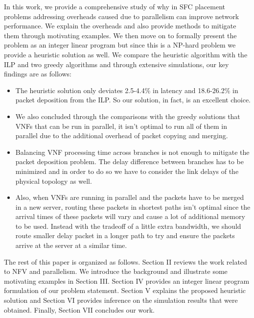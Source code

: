 \documentclass[journal]{IEEEtran}
\begin{document}
In this work, we provide a comprehensive study of why in SFC placement problems addressing overheads caused due to parallelism can improve network performance. We explain the overheads and also provide methods to mitigate them through motivating examples. We then move on to formally present the problem as an integer linear program but since this is a NP-hard problem we provide a heuristic solution as well. We compare the heuristic algorithm with the ILP and two greedy algorithms and through extensive simulations, our key findings are as follows:
\begin{itemize}
    \item The heuristic solution only deviates 2.5-4.4\% in latency and 18.6-26.2\% in packet deposition from the ILP. So our solution, in fact, is an excellent choice.
    \item We also concluded through the comparisons with the greedy solutions that VNFs that can be run in parallel, it isn't optimal to run all of them in parallel due to the additional overhead of packet copying and merging.
    \item Balancing VNF processing time across branches is not enough to mitigate the packet deposition problem. The delay difference between branches has to be minimized and in order to do so we have to consider the link delays of the physical topology as well. 
    \item Also, when VNFs are running in parallel and the packets have to be merged in a new server, routing these packets in shortest paths isn't optimal since the arrival times of these packets will vary and cause a lot of additional memory to be used. Instead with the tradeoff of a little extra bandwidth, we should route smaller delay packet in a longer path to try and ensure the packets arrive at the server at a similar time.
\end{itemize}

The rest of this paper is organized as follows. Section II reviews the work related to NFV and parallelism. We introduce the background and illustrate some motivating examples in Section III. Section IV provides an integer linear program formulation of our problem statement. Section V explains the proposed heuristic solution and Section VI provides inference on the simulation results that were obtained. Finally, Section VII concludes our work.
\end{document}
